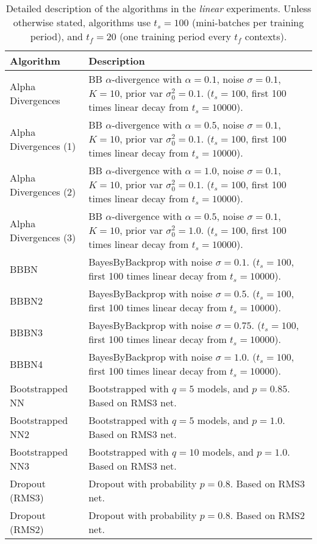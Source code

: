 \documentclass{article} \usepackage{iclr2018_conference,times}
\begin{document}
\begin{table}[ht]
  \caption{Detailed description of the algorithms in the \emph{linear} experiments. Unless otherwise stated, algorithms use $t_s = 100$ (mini-batches per training period), and $t_f = 20$ (one training period every $t_f$ contexts).}
  \label{tab:algo_linear_description}
  \centering
  \footnotesize
  \tiny
  \begin{tabular}{ll}
  Algorithm  & Description \\
    \midrule
Alpha Divergences & BB $\alpha$-divergence with $\alpha = 0.1$, noise $\sigma = 0.1$, $K=10$, prior var $\sigma_0^2 = 0.1$. ($t_s = 100$, first 100 times linear decay from $t_s = 10000$). \\
Alpha Divergences (1) & BB $\alpha$-divergence with $\alpha = 0.5$, noise $\sigma = 0.1$, $K=10$, prior var $\sigma_0^2 = 0.1$. ($t_s = 100$, first 100 times linear decay from $t_s = 10000$).  \\
Alpha Divergences (2) & BB $\alpha$-divergence with $\alpha = 1.0$, noise $\sigma = 0.1$, $K=10$, prior var $\sigma_0^2 = 0.1$. ($t_s = 100$, first 100 times linear decay from $t_s = 10000$).  \\
Alpha Divergences (3) & BB $\alpha$-divergence with $\alpha = 0.5$, noise $\sigma = 0.1$, $K=10$, prior var $\sigma_0^2 = 1.0$. ($t_s = 100$, first 100 times linear decay from $t_s = 10000$).  \\
BBBN & BayesByBackprop with noise $\sigma = 0.1$. ($t_s = 100$, first 100 times linear decay from $t_s = 10000$). \\
BBBN2 & BayesByBackprop with noise $\sigma = 0.5$. ($t_s = 100$, first 100 times linear decay from $t_s = 10000$). \\
BBBN3 & BayesByBackprop with noise $\sigma = 0.75$. ($t_s = 100$, first 100 times linear decay from $t_s = 10000$). \\
BBBN4 & BayesByBackprop with noise $\sigma = 1.0$. ($t_s = 100$, first 100 times linear decay from $t_s = 10000$). \\
Bootstrapped NN & Bootstrapped with $q = 5$ models, and $p = 0.85$. Based on RMS3 net. \\
Bootstrapped NN2 & Bootstrapped with $q = 5$ models, and $p = 1.0$. Based on RMS3 net. \\
Bootstrapped NN3 & Bootstrapped with $q = 10$ models, and $p = 1.0$. Based on RMS3 net. \\
Dropout (RMS3) & Dropout with probability $p = 0.8$. Based on RMS3 net. \\
Dropout (RMS2) & Dropout with probability $p = 0.8$. Based on RMS2 net. \\

\end{tabular}
\end{table}
\end{document}
